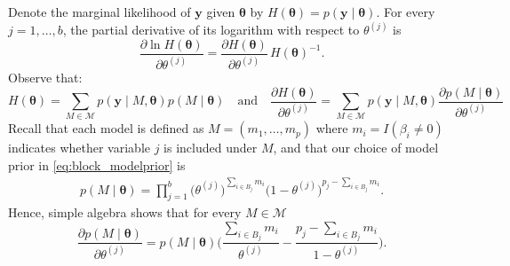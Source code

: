 \documentclass[bj,authoryear]{imsart}
\theoremstyle{plain}
\newcommand{\M}{\mathcal{M}}
\newcommand{\bs}{\boldsymbol}
\begin{document}
Denote the marginal likelihood of $\bs y$ given $\bs \theta$ by $H(\bs \theta)=p(\bs y \mid \bs \theta)$. For every $j=1,\ldots,b$, the partial derivative of its logarithm with respect to $\theta^{(j)}$ is
    \begin{equation}\label{eq:logderivative}
        \frac{\partial \ln H(\bs \theta)}{\partial \theta^{(j)}}=\frac{\partial H(\bs \theta)}{\partial \theta^{(j)}}\,H(\boldsymbol{\theta})^{-1}.
    \end{equation}
    Observe that:
    \begin{equation}\label{eq:partialmarglikelihood}
    H(\bs \theta)=\sum_{M \in \M}p(\bs y \mid M,\bs\theta)p(M \mid \bs \theta)
    \quad \text{and}\quad 
    \frac{\partial H(\bs \theta)}{\partial \theta^{(j)}}=\sum_{M\in \M}p(\bs y \mid M,\bs\theta)\frac{\partial p(M \mid \bs \theta)}{\partial \theta^{(j)}}
    \end{equation}
    Recall that each model is defined as $M=(m_1,\ldots,m_p)$ where $m_i = I(\beta_i \neq 0)$ indicates whether variable $j$ is included under $M$, and that our choice of model prior in \eqref{eq:block_modelprior} is 
    \begin{align}
        p( M \mid \boldsymbol{\theta})=
        \prod_{j=1}^b \big(\theta^{(j)}\big)^{\sum_{i \in B_j} m_i}
        \big(1 - \theta^{(j)}\big)^{p_j - \sum_{i \in B_j} m_i}.
        \nonumber
    \end{align}
    Hence, simple algebra shows that for every $M\in \mathcal M$
    \begin{equation}\label{eq:partialprobmodel}
    \frac{\partial p(M \mid \bs \theta)}{\partial \theta^{(j)}}= p(M \mid \bs \theta) \bigg(\frac{\sum_{i\in B_j}m_i}{\theta^{(j)}}-\frac{p_j-\sum_{i\in B_j}m_i}{1-\theta^{(j)}} \bigg).       
    \end{equation}
    
\end{document}
